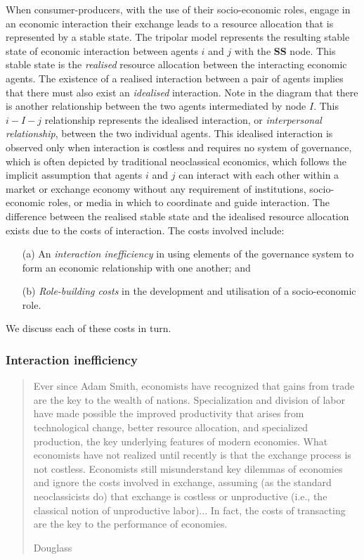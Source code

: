 When consumer-producers, with the use of their socio-economic roles, engage in an economic interaction their exchange leads to a resource allocation that is represented by a stable state. The tripolar model represents the resulting stable state of economic interaction between agents $i$ and $j$ with the \textbf{SS} node. This stable state is the \emph{realised} resource allocation between the interacting economic agents. The existence of a realised interaction between a pair of agents implies that there must also exist an \emph{idealised} interaction. Note in the diagram that there is another relationship between the two agents intermediated by node $I$. This $i-I-j$ relationship represents the idealised interaction, or \emph{interpersonal relationship}, between the two individual agents. This idealised interaction is observed only when interaction is costless and requires no system of governance, which is often depicted by traditional neoclassical economics, which follows the implicit assumption that agents $i$ and $j$ can interact with each other within a market or exchange economy without any requirement of institutions, socio-economic roles, or media in which to coordinate and guide interaction. The difference between the realised stable state and the idealised resource allocation exists due to the costs of interaction. The costs involved include: 
\begin{itemize}
\item[(a)] An \emph{interaction inefficiency} in using elements of the governance system to form an economic relationship with one another; and 
\item[(b)] \emph{Role-building costs} in the development and utilisation of a socio-economic role.
\end{itemize}
We discuss each of these costs in turn.

\subsubsection{Interaction inefficiency}
\label{subsubsec:interactionInefficiency}

\begin{quote}
Ever since Adam Smith, economists have recognized that gains from trade are the key to the wealth of nations. Specialization and division of labor have made possible the improved productivity that arises from technological change, better resource allocation, and specialized production, the key underlying features of modern economies. What economists have not realized until recently is that the exchange process is not costless. Economists still misunderstand key dilemmas of economies and ignore the costs involved in exchange, assuming (as the standard neoclassicists do) that exchange is costless or unproductive (i.e., the classical notion of unproductive labor)... In fact, the costs of transacting are the key to the performance of economies.

\begin{flushright}
Douglass \citet[p.~1320]{North1989}
\end{flushright}
\end{quote}

